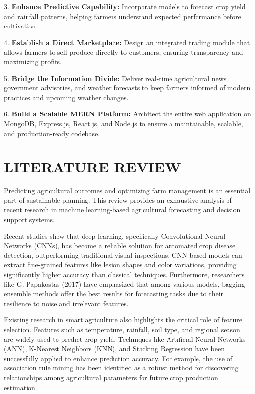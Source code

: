 \documentclass[12pt,a4paper]{report}
\begin{document}
3. \textbf{Enhance Predictive Capability:} Incorporate models to forecast crop yield and rainfall patterns, helping farmers understand expected performance before cultivation.

4. \textbf{Establish a Direct Marketplace:} Design an integrated trading module that allows farmers to sell produce directly to customers, ensuring transparency and maximizing profits.

5. \textbf{Bridge the Information Divide:} Deliver real-time agricultural news, government advisories, and weather forecasts to keep farmers informed of modern practices and upcoming weather changes.

6. \textbf{Build a Scalable MERN Platform:} Architect the entire web application on MongoDB, Express.js, React.js, and Node.js to ensure a maintainable, scalable, and production-ready codebase.

\newpage

\chapter{LITERATURE REVIEW}

Predicting agricultural outcomes and optimizing farm management is an essential part of sustainable planning. This review provides an exhaustive analysis of recent research in machine learning-based agricultural forecasting and decision support systems.

Recent studies show that deep learning, specifically Convolutional Neural Networks (CNNs), has become a reliable solution for automated crop disease detection, outperforming traditional visual inspections. CNN-based models can extract fine-grained features like lesion shapes and color variations, providing significantly higher accuracy than classical techniques. Furthermore, researchers like G. Papakostas (2017) have emphasized that among various models, bagging ensemble methods offer the best results for forecasting tasks due to their resilience to noise and irrelevant features.

Existing research in smart agriculture also highlights the critical role of feature selection. Features such as temperature, rainfall, soil type, and regional season are widely used to predict crop yield. Techniques like Artificial Neural Networks (ANN), K-Nearest Neighbors (KNN), and Stacking Regression have been successfully applied to enhance prediction accuracy. For example, the use of association rule mining has been identified as a robust method for discovering relationships among agricultural parameters for future crop production estimation.
\end{document}
